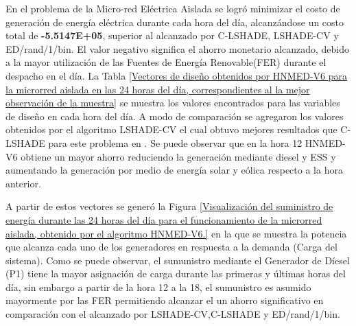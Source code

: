 En el problema de la Micro-red Eléctrica Aislada se logró minimizar el costo de generación de energía eléctrica durante cada hora del día, alcanzándose un costo total de \textbf{-5.5147E+05}, superior al alcanzado por C-LSHADE, LSHADE-CV y ED/rand/1/bin. El valor negativo significa el ahorro monetario alcanzado, debido a la mayor utilización de las Fuentes de Energía Renovable(FER) durante el despacho en el día.
La Tabla \ref{Vectores de diseño obtenidos por HNMED-V6 para la microrred aislada en las 24 horas del día, correspondientes al la mejor observación de la muestra} se muestra los valores encontrados para las variables de
diseño en cada hora del día. A modo de comparación se agregaron los valores obtenidos por el algoritmo LSHADE-CV el cual obtuvo mejores resultados que C-LSHADE para este problema en \cite{zapata_zapata_control_2017}. Se puede observar que en la hora 12 HNMED-V6 obtiene un mayor ahorro reduciendo la generación mediante diesel y ESS y aumentando la generación por medio de energía solar y eólica respecto a la hora anterior. 

A partir de estos vectores se generó la Figura \ref{Visualización del suministro de energía durante las 24 horas del día para el funcionamiento de la microrred aislada, obtenido por el algoritmo HNMED-V6.} en la que se muestra la potencia que alcanza cada uno de los generadores en respuesta a la demanda (Carga del sistema). Como se puede observar, el sumunistro mediante el Generador de Díesel (P1) tiene la mayor asignación de carga durante las primeras  y últimas horas del día, sin embargo a partir de la hora 12 a la 18, el sumunistro es asumido mayormente por las FER permitiendo alcanzar el un ahorro significativo en comparación con el alcanzado por LSHADE-CV,C-LSHADE y ED/rand/1/bin.

